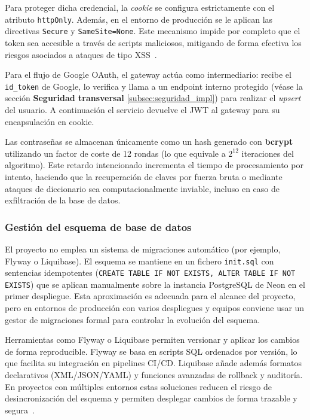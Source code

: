 Para proteger dicha credencial, la \textit{cookie} se configura estrictamente con el atributo
\texttt{httpOnly}. Además, en el entorno de producción se le aplican las directivas
\texttt{Secure} y \texttt{SameSite=None}. Este mecanismo impide por completo que el token
sea accesible a través de scripts maliciosos, mitigando de forma efectiva los riesgos
asociados a ataques de tipo XSS~\cite{owasp_xss}.

Para el flujo de Google OAuth, el gateway actúa como intermediario: recibe el
\texttt{id\_token} de Google, lo verifica y llama a un endpoint interno protegido
(véase la sección \textbf{Seguridad transversal} \ref{subsec:seguridad_impl}) para realizar el \textit{upsert} del
usuario. A continuación el servicio devuelve el JWT al gateway para su encapsulación
en cookie.

Las contraseñas se almacenan únicamente como un hash generado con \textbf{bcrypt} \cite{bcrypt,provos1999bcrypt}
utilizando un factor de coste de 12 rondas (lo que equivale a $2^{12}$ iteraciones del algoritmo).
Este retardo intencionado incrementa el tiempo de procesamiento por intento, haciendo que la recuperación
de claves por fuerza bruta o mediante ataques de diccionario sea computacionalmente inviable,
incluso en caso de exfiltración de la base de datos.

\subsubsection*{Gestión del esquema de base de datos}

El proyecto no emplea un sistema de migraciones automático (por ejemplo, Flyway o Liquibase). El esquema se mantiene en un fichero
\texttt{init.sql} con sentencias idempotentes (\texttt{CREATE TABLE IF NOT EXISTS, ALTER TABLE IF NOT EXISTS}) que se aplican manualmente sobre la
instancia PostgreSQL de Neon en el primer despliegue. Esta aproximación es adecuada para el alcance del proyecto, pero en entornos de
producción con varios despliegues y equipos conviene usar un gestor de migraciones formal para controlar la evolución del esquema.

Herramientas como Flyway o Liquibase permiten versionar y aplicar los cambios de forma reproducible. Flyway se basa en scripts SQL
ordenados por versión, lo que facilita su integración en pipelines CI/CD. Liquibase añade además formatos declarativos (XML/JSON/YAML)
y funciones avanzadas de rollback y auditoría. En proyectos con múltiples entornos estas soluciones reducen el riesgo de desincronización
del esquema y permiten desplegar cambios de forma trazable y segura~\cite{flyway,liquibase}.

